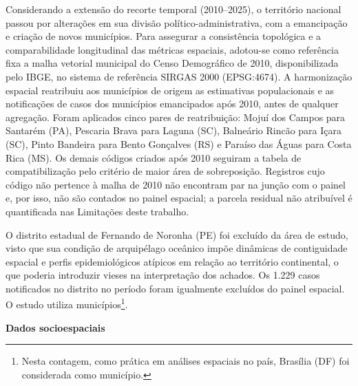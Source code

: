 Considerando a extensão do recorte temporal (2010--2025), o território nacional passou por alterações em sua divisão político-administrativa, com a emancipação e criação de novos municípios. Para assegurar a consistência topológica e a comparabilidade longitudinal das métricas espaciais, adotou-se como referência fixa a malha vetorial municipal do Censo Demográfico de 2010, disponibilizada pelo IBGE, no sistema de referência SIRGAS 2000 (EPSG:4674). A harmonização espacial reatribuiu aos municípios de origem as estimativas populacionais e as notificações de casos dos municípios emancipados após 2010, antes de qualquer agregação. Foram aplicados cinco pares de reatribuição: Mojuí dos Campos para Santarém (PA), Pescaria Brava para Laguna (SC), Balneário Rincão para Içara (SC), Pinto Bandeira para Bento Gonçalves (RS) e Paraíso das Águas para Costa Rica (MS). Os demais códigos criados após 2010 seguiram a tabela de compatibilização pelo critério de maior área de sobreposição. Registros cujo código não pertence à malha de 2010 não encontram par na junção com o painel e, por isso, não são contados no painel espacial; a parcela residual não atribuível é quantificada nas Limitações deste trabalho.

O distrito estadual de Fernando de Noronha (PE) foi excluído da área de estudo, visto que sua condição de arquipélago oceânico impõe dinâmicas de contiguidade espacial e perfis epidemiológicos atípicos em relação ao território continental, o que poderia introduzir vieses na interpretação dos achados. Os 1.229 casos notificados no distrito no período foram igualmente excluídos do painel espacial. O estudo utiliza \NumMunicipios{} municípios\footnote{Nesta contagem, como prática em análises espaciais no país, Brasília (DF) foi considerada como município.}.

\noindent \textbf{Dados socioespaciais}

